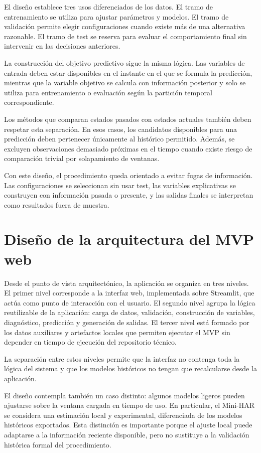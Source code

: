 El diseño establece tres usos diferenciados de los datos. El tramo de entrenamiento se utiliza para ajustar parámetros y modelos. El tramo de validación permite elegir configuraciones cuando existe más de una alternativa razonable. El tramo de test se reserva para evaluar el comportamiento final sin intervenir en las decisiones anteriores.

La construcción del objetivo predictivo sigue la misma lógica. Las variables de entrada deben estar disponibles en el instante en el que se formula la predicción, mientras que la variable objetivo se calcula con información posterior y solo se utiliza para entrenamiento o evaluación según la partición temporal correspondiente.

Los métodos que comparan estados pasados con estados actuales también deben respetar esta separación. En esos casos, los candidatos disponibles para una predicción deben pertenecer únicamente al histórico permitido. Además, se excluyen observaciones demasiado próximas en el tiempo cuando existe riesgo de comparación trivial por solapamiento de ventanas.

Con este diseño, el procedimiento queda orientado a evitar fugas de información. Las configuraciones se seleccionan sin usar test, las variables explicativas se construyen con información pasada o presente, y las salidas finales se interpretan como resultados fuera de muestra.

\section{Diseño de la arquitectura del MVP web}\label{sec:diseno-mvp}

Desde el punto de vista arquitectónico, la aplicación se organiza en tres niveles. El primer nivel corresponde a la interfaz web, implementada sobre Streamlit, que actúa como punto de interacción con el usuario. El segundo nivel agrupa la lógica reutilizable de la aplicación: carga de datos, validación, construcción de variables, diagnóstico, predicción y generación de salidas. El tercer nivel está formado por los datos auxiliares y artefactos locales que permiten ejecutar el MVP sin depender en tiempo de ejecución del repositorio técnico.

La separación entre estos niveles permite que la interfaz no contenga toda la lógica del sistema y que los modelos históricos no tengan que recalcularse desde la aplicación.

El diseño contempla también un caso distinto: algunos modelos ligeros pueden ajustarse sobre la ventana cargada en tiempo de uso. En particular, el Mini-HAR se considera una estimación local y experimental, diferenciada de los modelos históricos exportados. Esta distinción es importante porque el ajuste local puede adaptarse a la información reciente disponible, pero no sustituye a la validación histórica formal del procedimiento.